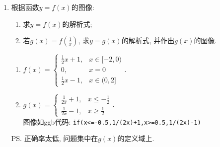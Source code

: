 \begin{enumerate}
\begin{jieda}
\begin{enumerate}
\item 解$f(x)\in[-1,1]$得$x\zr$; 解$f(x)\in(-\infty,-1)\cup(1,+\infty)$得$x\in\varnothing$. \\
于是$g(f(x))=\sqrt{1-f^2(x)}=\begin{cases}
\sqrt{1-x^4}, & x\in[-1,1]; \\
0, & x<-1\lor x>1
\end{cases}$. 
\end{enumerate}
\end{jieda}
\begin{vspace_}
\vsp[3]
\end{vspace_}

\item 根据函数$y=f(x)$的图像: \\
\begin{enumerate}
\item 求$y=f(x)$的解析式; 
\item 若$g(x)=f(\frac{1}{x})$, 求$y=g(x)$的解析式, 并作出$g(x)$的图像. 
\end{enumerate}
\begin{jieda}
\begin{enumerate}
\item $f(x)=\begin{cases}
\frac{1}{2}x+1, & x\in[-2,0)\\
0, & x = 0 \\
\frac{1}{2}x-1, & x\in(0,2]
\end{cases}$. 

\item $g(x)=\begin{cases}
\frac{1}{2x}+1, & x\leq-\frac{1}{2}\\
\frac{1}{2x}-1, & x\geq\frac{1}{2}
\end{cases}$. \\
图像如ggb代码: \verb|if(x<=-0.5,1/(2x)+1,x>=0.5,1/(2x)-1)|
\end{enumerate}
\ps 正确率太低, 问题集中在$g(x)$的定义域上.
\end{jieda}
\begin{vspace_}
\vsp[5]
\end{vspace_}


\end{enumerate}
